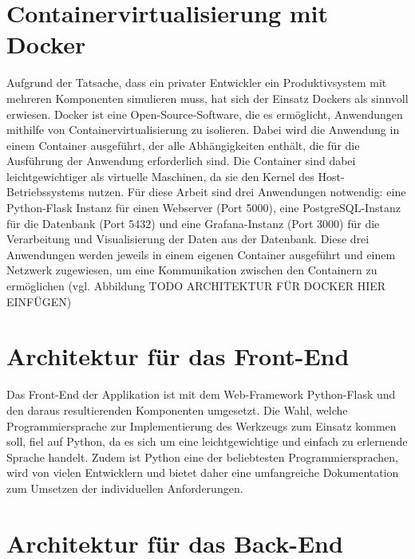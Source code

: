 \section{Containervirtualisierung mit Docker}
Aufgrund der Tatsache, dass ein privater Entwickler ein Produktivsystem mit mehreren Komponenten simulieren muss, hat sich der Einsatz Dockers als sinnvoll erwiesen. Docker ist eine Open-Source-Software, die es ermöglicht, Anwendungen mithilfe von Containervirtualisierung zu isolieren. Dabei wird die Anwendung in einem Container ausgeführt, der alle Abhängigkeiten enthält, die für die Ausführung der Anwendung erforderlich sind. Die Container sind dabei leichtgewichtiger als virtuelle Maschinen, da sie den Kernel des Host-Betriebssystems nutzen. Für diese Arbeit sind drei Anwendungen notwendig: eine Python-Flask Instanz für einen Webserver (Port 5000), eine PostgreSQL-Instanz für die Datenbank (Port 5432) und eine Grafana-Instanz (Port 3000) für die Verarbeitung und Visualisierung der Daten aus der Datenbank. Diese drei Anwendungen werden jeweils in einem eigenen Container ausgeführt und einem Netzwerk zugewiesen, um eine Kommunikation zwischen den Containern zu ermöglichen (vgl. Abbildung TODO ARCHITEKTUR FÜR DOCKER HIER EINFÜGEN)

\section{Architektur für das Front-End}
Das Front-End der Applikation ist mit dem Web-Framework Python-Flask und den daraus resultierenden Komponenten umgesetzt. Die Wahl, welche Programmiersprache zur Implementierung des Werkzeugs zum Einsatz kommen soll, fiel auf Python, da es sich um eine leichtgewichtige und einfach zu erlernende Sprache handelt. Zudem ist Python eine der beliebtesten Programmiersprachen, wird von vielen Entwicklern und bietet daher eine umfangreiche Dokumentation zum Umsetzen der individuellen Anforderungen. 

\section{Architektur für das Back-End}
